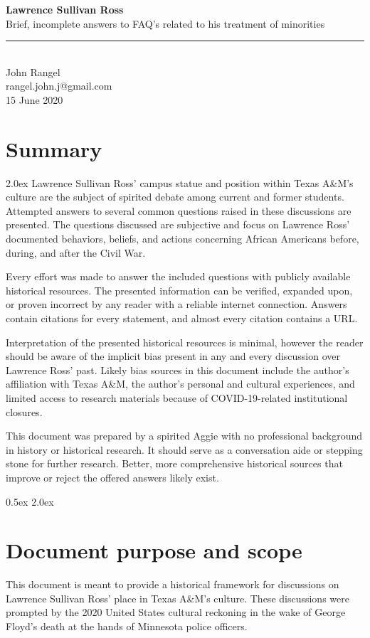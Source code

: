 \documentclass[12pt]{article}
\begin{document}
\Large{\textbf{Lawrence Sullivan Ross \\}}
\large{Brief, incomplete answers to FAQ's related to his treatment of minorities \\}
\rule{\textwidth}{1pt}
\\John Rangel\\rangel.john.j@gmail.com\\15 June 2020\\

\section{Summary}
\parskip 2.0ex
Lawrence Sullivan Ross' campus statue and position within Texas A\&M's culture are the subject of spirited debate among current and former students. Attempted answers to several common questions raised in these discussions are presented. The questions discussed are subjective and focus on Lawrence Ross' documented behaviors, beliefs, and actions concerning African Americans before, during, and after the Civil War. 

Every effort was made to answer the included questions with publicly available historical resources. The presented information can be verified, expanded upon, or proven incorrect by any reader with a reliable internet connection. Answers contain citations for every statement, and almost every citation contains a URL. 

Interpretation of the presented historical resources is minimal, however the reader should be aware of the implicit bias present in any and every discussion over Lawrence Ross' past. Likely bias sources in this document include the author's affiliation with Texas A\&M, the author's personal and cultural experiences, and limited access to research materials because of COVID-19-related institutional closures.

This document was prepared by a spirited Aggie with no professional background in history or  historical research. It should serve as a conversation aide or stepping stone for further research. Better, more comprehensive historical sources that improve or reject the offered answers likely exist. 

\parskip 0.5ex
\newpage
\tableofcontents
\parskip 2.0ex

\newpage
\section{Document purpose and scope}
This document is meant to provide a historical framework for discussions on Lawrence Sullivan Ross' place in Texas A\&M's culture. These discussions were prompted by the 2020 United States cultural reckoning in the wake of George Floyd's death at the hands of Minnesota police officers. 
\end{document}
